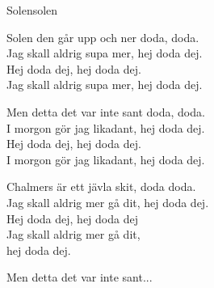\begin{song}{Solen}{solen}
\begin{vers}
Solen den går upp och ner doda, doda.\\
Jag skall aldrig supa mer, hej doda dej.\\
Hej doda dej, hej doda dej.\\
Jag skall aldrig supa mer, hej doda dej.\\
\end{vers}
\begin{vers}
Men detta det var inte sant doda, doda.\\
I morgon gör jag likadant, hej doda dej.\\
Hej doda dej, hej doda dej.\\
I morgon gör jag likadant, hej doda dej.\\
\end{vers}
\begin{vers}
Chalmers är ett jävla skit, doda doda.\\
Jag skall aldrig mer gå dit, hej doda dej.\\
Hej doda dej, hej doda dej\\
Jag skall aldrig mer gå dit,\\
hej doda dej.\\
\end{vers}
\begin{vers}
Men detta det var inte sant...\\
\end{vers}
\end{song}
